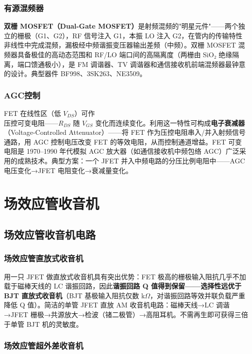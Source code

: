 \documentclass[12pt,UTF8]{ctexbook}
\begin{document}
\subsection{有源混频器}

\textbf{双栅 MOSFET（Dual-Gate MOSFET）}是射频混频的"明星元件"——两个独立的栅极（G1、G2），RF 信号注入 G1，本振 LO 注入 G2，在管内的传输特性非线性中完成混频，漏极经中频谐振变压器输出差频（中频）。双栅 MOSFET 混频器具备极佳的高动态范围和 RF/LO 端口间的高隔离度（两栅由 SiO₂ 绝缘隔离，端口馈通极小），是 FM 调谐器、TV 调谐器和通信接收机前端混频器最钟意的设计。典型器件 BF998、3SK263、NE3509。

\subsection{AGC控制}

FET 在线性区（低 $V_{DS}$）可作\\压控可变电阻——$R_{DS}$ 随 $V_{GS}$ 变化而连续变化。利用这一特性可构成\textbf{电子衰减器}（Voltage-Controlled Attenuator）——将 FET 作为压控电阻串入/并入射频信号通路，用 AGC 控制电压改变 FET 的等效电阻，从而控制通道增益。FET 可变电阻是 1970–1990 年代模拟 AGC 放大器（如通信接收机中频包络 AGC）广泛采用的成熟技术。典型方案：一个 JFET 并入中频电路的分压比例电阻中——AGC 电压变化→JFET 电阻变化→衰减量变化。

\chapter{场效应管收音机}
\label{chap:fet_radio}

\section{场效应管收音机电路}
\label{sec:fet_radio_circuits}

\subsection{场效应管直放式收音机}

用一只 JFET 做直放式收音机具有突出优势：FET 极高的栅极输入阻抗几乎不加载于磁棒天线的 LC 谐振回路，因此\textbf{谐振回路 Q 值得到保留——选择性远优于 BJT 直放式收音机}（BJT 基极输入阻抗仅数 k$\Omega$，对谐振回路等效并联负载严重降低 Q 值）。简洁的单管 JFET 直放 AM 收音机电路：磁棒天线→LC 调谐→JFET 栅极→共源放大→检波（锗二极管）→高阻耳机。不需再生即可获得三倍于单管 BJT 机的灵敏度。

\subsection{场效应管超外差收音机}
\end{document}
